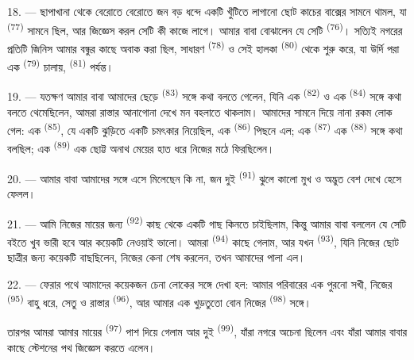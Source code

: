 \VUsaut{3.0mm}

18. --- ছাপাখানা থেকে বেরোতে বেরোতে জন বড় ধন্দে একটি খুঁটিতে লাগানো ছোট কাচের
বাক্সের সামনে থামল, যা  \textsuperscript{(77)} সামনে
ছিল, আর জিজ্ঞেস করল সেটি কী কাজে লাগে। আমার বাবা বোঝালেন যে সেটি
 \textsuperscript{(76)}। সত্যিই নগরের প্রতিটি জিনিস
আমার বন্ধুর কাছে অবাক করা ছিল, সাধারণ  \textsuperscript{(78)} ও
সেই হালকা  \textsuperscript{(80)} থেকে শুরু করে, যা উর্দি
পরা এক  \textsuperscript{(79)} চালায়, 
\textsuperscript{(81)} পর্যন্ত।

19. --- যতক্ষণ আমার বাবা আমাদের ছেড়ে 
\textsuperscript{(83)} সঙ্গে কথা বলতে গেলেন, যিনি এক 
\textsuperscript{(82)} ও এক  \textsuperscript{(84)} সঙ্গে কথা বলতে
থেমেছিলেন, আমরা রাস্তার আনাগোনা দেখে মন বহলাতে থাকলাম। আমাদের সামনে দিয়ে নানা
রকম লোক গেল: এক  \textsuperscript{(85)}, যে একটি ঝুড়িতে
একটি চমৎকার  নিয়েছিল, এক 
\textsuperscript{(86)} পিছনে এল; এক 
\textsuperscript{(87)} এক  \textsuperscript{(88)} সঙ্গে
কথা বলছিল; এক  \textsuperscript{(89)} এক ছোট্ট অনাথ মেয়ের
হাত ধরে নিজের মঠে ফিরছিলেন।

\VUsaut{3.0mm}

20. --- আমার বাবা আমাদের সঙ্গে এসে মিলেছেন কি না, জন দুই  \textsuperscript{(91)} ঝুলে কালো মুখ ও অদ্ভুত বেশ দেখে হেসে ফেলল।

21. --- আমি নিজের মায়ের জন্য  \textsuperscript{(92)} কাছ
থেকে একটি গাছ কিনতে চাইছিলাম, কিন্তু আমার বাবা বললেন যে সেটি বইতে খুব ভারী হবে
আর কয়েকটি  নেওয়াই ভালো। আমরা 
\textsuperscript{(94)} কাছে গেলাম, আর যখন 
\textsuperscript{(93)}, যিনি নিজের ছোট ছাত্রীর জন্য কয়েকটি বাছছিলেন, নিজের কেনা
শেষ করলেন, তখন আমাদের পালা এল।

22. --- ফেরার পথে আমাদের কয়েকজন চেনা লোকের সঙ্গে দেখা হল: আমার পরিবারের এক
পুরনো সখী, নিজের  \textsuperscript{(95)} বাহু ধরে, সেতু ও
রাস্তার  \textsuperscript{(96)}, আর আমার এক খুড়তুতো বোন নিজের
 \textsuperscript{(98)} সঙ্গে।

তারপর আমরা আমার মায়ের  \textsuperscript{(97)} পাশ
দিয়ে গেলাম আর দুই  \textsuperscript{(99)}, যাঁরা নগরে অচেনা
ছিলেন এবং যাঁরা আমার বাবার কাছে স্টেশনের পথ জিজ্ঞেস করতে এলেন।
\VUsaut{6.0mm}
\VUfilet{22mm}
